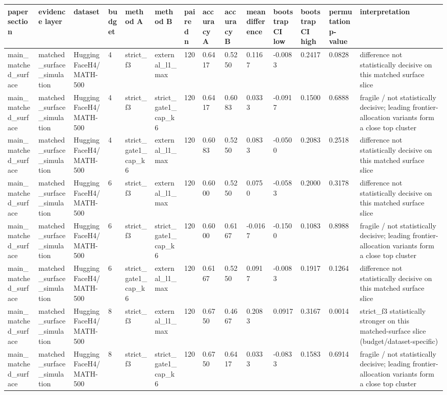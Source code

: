 \begin{tabular}{llllllllllllll}
\hline
paper section & evidence layer & dataset & budget & method A & method B & paired n & accuracy A & accuracy B & mean difference & bootstrap CI low & bootstrap CI high & permutation p-value & interpretation \\
\hline
main\_matched\_surface & matched\_surface\_simulation & HuggingFaceH4/MATH-500 & 4 & strict\_f3 & external\_l1\_max & 120 & 0.6417 & 0.5250 & 0.1167 & -0.0083 & 0.2417 & 0.0828 & difference not statistically decisive on this matched surface slice \\
main\_matched\_surface & matched\_surface\_simulation & HuggingFaceH4/MATH-500 & 4 & strict\_f3 & strict\_gate1\_cap\_k6 & 120 & 0.6417 & 0.6083 & 0.0333 & -0.0917 & 0.1500 & 0.6888 & fragile / not statistically decisive; leading frontier-allocation variants form a close top cluster \\
main\_matched\_surface & matched\_surface\_simulation & HuggingFaceH4/MATH-500 & 4 & strict\_gate1\_cap\_k6 & external\_l1\_max & 120 & 0.6083 & 0.5250 & 0.0833 & -0.0500 & 0.2083 & 0.2518 & difference not statistically decisive on this matched surface slice \\
main\_matched\_surface & matched\_surface\_simulation & HuggingFaceH4/MATH-500 & 6 & strict\_f3 & external\_l1\_max & 120 & 0.6000 & 0.5250 & 0.0750 & -0.0583 & 0.2000 & 0.3178 & difference not statistically decisive on this matched surface slice \\
main\_matched\_surface & matched\_surface\_simulation & HuggingFaceH4/MATH-500 & 6 & strict\_f3 & strict\_gate1\_cap\_k6 & 120 & 0.6000 & 0.6167 & -0.0167 & -0.1500 & 0.1083 & 0.8988 & fragile / not statistically decisive; leading frontier-allocation variants form a close top cluster \\
main\_matched\_surface & matched\_surface\_simulation & HuggingFaceH4/MATH-500 & 6 & strict\_gate1\_cap\_k6 & external\_l1\_max & 120 & 0.6167 & 0.5250 & 0.0917 & -0.0083 & 0.1917 & 0.1264 & difference not statistically decisive on this matched surface slice \\
main\_matched\_surface & matched\_surface\_simulation & HuggingFaceH4/MATH-500 & 8 & strict\_f3 & external\_l1\_max & 120 & 0.6750 & 0.4667 & 0.2083 & 0.0917 & 0.3167 & 0.0014 & strict\_f3 statistically stronger on this matched-surface slice (budget/dataset-specific) \\
main\_matched\_surface & matched\_surface\_simulation & HuggingFaceH4/MATH-500 & 8 & strict\_f3 & strict\_gate1\_cap\_k6 & 120 & 0.6750 & 0.6417 & 0.0333 & -0.0833 & 0.1583 & 0.6914 & fragile / not statistically decisive; leading frontier-allocation variants form a close top cluster \\

\end{tabular}

